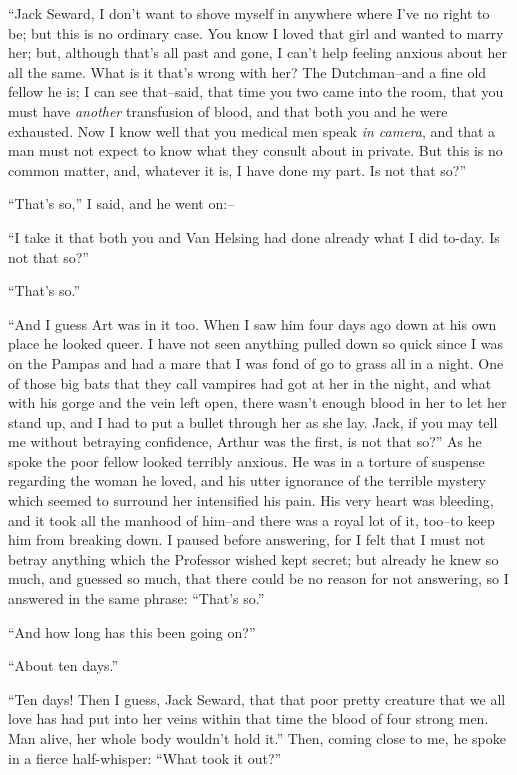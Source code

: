 \documentclass[12pt,openright]{book}
\begin{document}
“Jack Seward, I don’t want to shove myself in anywhere where I’ve no right to be; but this is no ordinary case. You know I loved that girl and wanted to marry her; but, although that’s all past and gone, I can’t help feeling anxious about her all the same. What is it that’s wrong with her? The Dutchman–and a fine old fellow he is; I can see that–said, that time you two came into the room, that you must have \textit{another} transfusion of blood, and that both you and he were exhausted. Now I know well that you medical men speak \textit{in camera}, and that a man must not expect to know what they consult about in private. But this is no common matter, and, whatever it is, I have done my part. Is not that so?”

“That’s so,” I said, and he went on:–

“I take it that both you and Van Helsing had done already what I did to-day. Is not that so?”

“That’s so.”

“And I guess Art was in it too. When I saw him four days ago down at his own place he looked queer. I have not seen anything pulled down so quick since I was on the Pampas and had a mare that I was fond of go to grass all in a night. One of those big bats that they call vampires had got at her in the night, and what with his gorge and the vein left open, there wasn’t enough blood in her to let her stand up, and I had to put a bullet through her as she lay. Jack, if you may tell me without betraying confidence, Arthur was the first, is not that so?” As he spoke the poor fellow looked terribly anxious. He was in a torture of suspense regarding the woman he loved, and his utter ignorance of the terrible mystery which seemed to surround her intensified his pain. His very heart was bleeding, and it took all the manhood of him–and there was a royal lot of it, too–to keep him from breaking down. I paused before answering, for I felt that I must not betray anything which the Professor wished kept secret; but already he knew so much, and guessed so much, that there could be no reason for not answering, so I answered in the same phrase: “That’s so.”

“And how long has this been going on?”

“About ten days.”

“Ten days! Then I guess, Jack Seward, that that poor pretty creature that we all love has had put into her veins within that time the blood of four strong men. Man alive, her whole body wouldn’t hold it.” Then, coming close to me, he spoke in a fierce half-whisper: “What took it out?”
\end{document}
